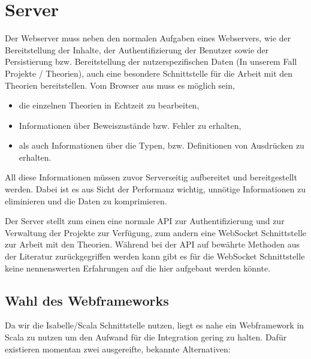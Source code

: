 \section{Server}

Der Webserver muss neben den normalen Aufgaben eines Webservers, wie der Bereitstellung der Inhalte,
der Authentifizierung der Benutzer sowie der Persistierung bzw. Bereitstellung der
nutzerspezifischen Daten (In unserem Fall Projekte / Theorien), auch eine besondere Schnittstelle
für die Arbeit mit den Theorien bereitstellen. Vom Browser aus muss es möglich sein,

\begin{itemize}
  \item die einzelnen Theorien in Echtzeit zu bearbeiten,
  \item Informationen über Beweiszustände bzw. Fehler zu erhalten,
  \item als auch Informationen über die Typen, bzw. Definitionen von Ausdrücken zu erhalten.
\end{itemize}

All diese Informationen müssen zuvor Serverseitig aufbereitet und bereitgestellt werden. Dabei ist
es aus Sicht der Performanz wichtig, unnötige Informationen zu eliminieren und die Daten zu
komprimieren.

Der Server stellt zum einen eine normale  API zur Authentifizierung und zur Verwaltung der
Projekte zur Verfügung, zum andern eine WebSocket Schnittstelle zur Arbeit mit den Theorien. Während
bei der  API auf bewährte Methoden aus der Literatur zurückgegriffen werden kann gibt es
für die WebSocket Schnittstelle keine nennenswerten Erfahrungen auf die hier aufgebaut werden
könnte.

\subsection{Wahl des Webframeworks}

Da wir die Isabelle/Scala Schnittstelle nutzen, liegt es nahe ein Webframework in Scala zu nutzen um
den Aufwand für die Integration gering zu halten. Dafür existieren momentan zwei ausgereifte,
bekannte Alternativen:

